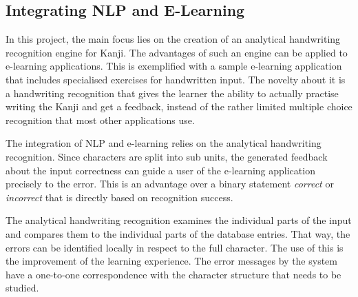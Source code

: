 
\subsection{Integrating NLP and E-Learning}
\label{sec:intro:integratingnlpandelearning}

In this project, the main focus lies on the creation of an analytical handwriting
recognition engine for Kanji. The advantages of such an engine can be applied to
e-learning applications. This is exemplified with a sample e-learning application
that includes specialised exercises for handwritten input.
The novelty about it is a handwriting recognition that gives the learner the 
ability to actually practise writing the Kanji and get a feedback, instead of 
the rather limited multiple choice recognition that most other applications use.

The integration of NLP and e-learning relies on the analytical handwriting
recognition. Since characters are split into sub units, the generated feedback 
about the input correctness can guide a user of the e-learning application 
precisely to the error. This is an advantage over a binary statement 
\emph{correct} or \emph{incorrect} that is directly based on recognition success.

The analytical handwriting recognition examines the individual parts of the
input and compares them to the individual parts of the database entries.
That way, the errors can be identified locally in respect to the full character.
The use of this is the improvement of the learning experience. The error messages
by the system have a one-to-one correspondence with the character 
structure that needs to be studied.